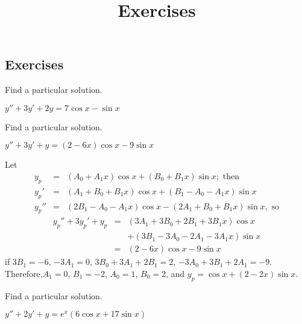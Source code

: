 \documentclass{ximera}
\title{Exercises} \license{CC BY-NC-SA 4.0}
\begin{document}
\begin{abstract}
\end{abstract}
\maketitle

\begin{onlineOnly}
\section*{Exercises}
\end{onlineOnly}


\begin{problem}\label{exer:5.5.1} Find a particular solution. 

$y''+3y'+2y=7\cos x-\sin x$
\end{problem}

\begin{problem}\label{exer:5.5.2} Find a particular solution. 

$y''+3y'+y=(2-6x)\cos x-9\sin x$

\begin{solution}
Let
\begin{eqnarray*}
y_p&=&(A_0+A_1x)\cos x+(B_0+B_1x)\sin x; \text{ then}\\
y_p'&=&(A_1+B_0+B_1x)\cos x+(B_1-A_0-A_1x)\sin x\\
y_p''&=&(2B_1-A_0-A_1x)\cos x-(2A_1+B_0+B_1x)\sin x, \text{ so}
\end{eqnarray*}
\begin{eqnarray*}
y_p''+3y_p'+y_p&=&(3A_1+3B_0+2B_1+3B_1x)\cos x \\
&&+(3B_1-3A_0-2A_1-3A_1x)\sin x \\
&=&(2-6x)\cos x-9\sin x
\end{eqnarray*}
if $3B_1=-6$, $-3A_1=0$, $3B_0+3A_1+2B_1=2$, $-3A_0+3B_1+2A_1=-9$.
Therefore,$A_1=0$,   $B_1=-2$, $A_0=1$, $B_0=2$, and
 $y_p=\cos x+(2-2x)\sin x$.

\end{solution}

\end{problem}

\begin{problem}\label{exer:5.5.3} Find a particular solution. 

$y''+2y'+y=e^x(6\cos x+17\sin x)$
\end{problem}
\end{document}
